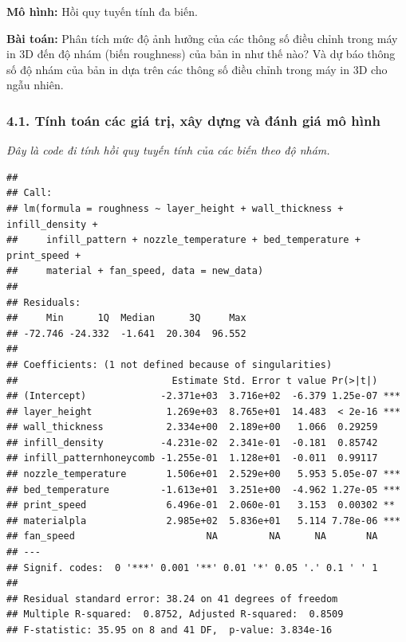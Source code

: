 \textbf{Mô hình:} Hồi quy tuyến tính đa biến.

\textbf{Bài toán:} Phân tích mức độ ảnh hưởng của các thông số điều
chỉnh trong máy in 3D đến độ nhám (biến roughness) của bản in như thế
nào? Và dự báo thông số độ nhám của bản in dựa trên các thông số điều
chỉnh trong máy in 3D cho ngẫu nhiên.

\subsubsection*{4.1. Tính toán các giá trị, xây dựng và đánh giá mô hình}

\emph{Đây là code đi tính hồi quy tuyến tính của các biến theo độ nhám.}

\begin{Shaded}
\begin{Highlighting}[]
\OtherTok{\textless{}{-}} \SpecialCharTok{\textasciitilde{}}\SpecialCharTok{+}\SpecialCharTok{+}\SpecialCharTok{+}\SpecialCharTok{+}
\SpecialCharTok{+}\SpecialCharTok{+}\SpecialCharTok{+}\SpecialCharTok{+} 
\end{Highlighting}
\end{Shaded}

\begin{verbatim}
## 
## Call:
## lm(formula = roughness ~ layer_height + wall_thickness + infill_density + 
##     infill_pattern + nozzle_temperature + bed_temperature + print_speed + 
##     material + fan_speed, data = new_data)
## 
## Residuals:
##     Min      1Q  Median      3Q     Max 
## -72.746 -24.332  -1.641  20.304  96.552 
## 
## Coefficients: (1 not defined because of singularities)
##                           Estimate Std. Error t value Pr(>|t|)    
## (Intercept)             -2.371e+03  3.716e+02  -6.379 1.25e-07 ***
## layer_height             1.269e+03  8.765e+01  14.483  < 2e-16 ***
## wall_thickness           2.334e+00  2.189e+00   1.066  0.29259    
## infill_density          -4.231e-02  2.341e-01  -0.181  0.85742    
## infill_patternhoneycomb -1.255e-01  1.128e+01  -0.011  0.99117    
## nozzle_temperature       1.506e+01  2.529e+00   5.953 5.05e-07 ***
## bed_temperature         -1.613e+01  3.251e+00  -4.962 1.27e-05 ***
## print_speed              6.496e-01  2.060e-01   3.153  0.00302 ** 
## materialpla              2.985e+02  5.836e+01   5.114 7.78e-06 ***
## fan_speed                       NA         NA      NA       NA    
## ---
## Signif. codes:  0 '***' 0.001 '**' 0.01 '*' 0.05 '.' 0.1 ' ' 1
## 
## Residual standard error: 38.24 on 41 degrees of freedom
## Multiple R-squared:  0.8752, Adjusted R-squared:  0.8509 
## F-statistic: 35.95 on 8 and 41 DF,  p-value: 3.834e-16
\end{verbatim}

